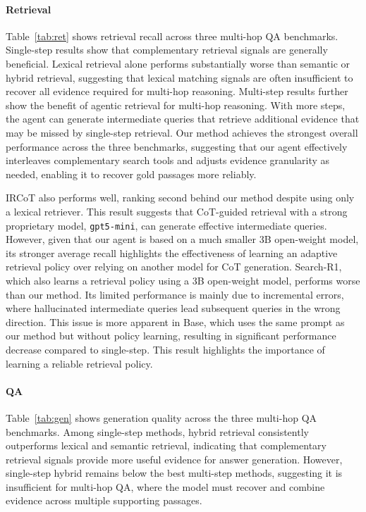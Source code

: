 \documentclass[11pt]{article}
\newcommand{\ml}[1]{\textcolor{orange}{\bf [lan: #1]}}
\begin{document}
\paragraph{Retrieval} 
Table~\ref{tab:ret} shows retrieval recall across three multi-hop QA benchmarks. Single-step results show that complementary retrieval signals are generally beneficial. Lexical retrieval alone performs substantially worse than semantic or hybrid retrieval, suggesting that lexical matching signals are often insufficient to recover all evidence required for multi-hop reasoning.
Multi-step results further show the benefit of agentic retrieval for multi-hop reasoning. With more steps, the agent can generate intermediate queries that retrieve additional evidence that may be missed by single-step retrieval. Our method achieves the strongest overall performance across the three benchmarks, suggesting that our agent effectively interleaves complementary search tools and adjusts evidence granularity as needed, enabling it to recover gold passages more reliably.

IRCoT also performs well, ranking second behind our method despite using only a lexical retriever. This result suggests that CoT-guided retrieval with a strong proprietary model, \texttt{gpt5-mini}, can generate effective intermediate queries. However, given that our agent is based on a much smaller 3B open-weight model, its stronger average recall highlights the effectiveness of learning an adaptive retrieval policy over relying on another model for CoT generation. 
%
Search-R1, which also learns a retrieval policy using a 3B open-weight model, performs worse than our method. Its limited performance is mainly due to incremental errors, where hallucinated intermediate queries lead subsequent queries in the wrong direction. This issue is more apparent in Base, which uses the same prompt as our method but without policy learning, resulting in significant performance decrease compared to single-step. This result highlights the importance of learning a reliable retrieval policy.


\paragraph{QA}



Table~\ref{tab:gen} shows generation quality across the three multi-hop QA benchmarks. Among single-step methods, hybrid retrieval consistently outperforms lexical and semantic retrieval, indicating that complementary retrieval signals provide more useful evidence for answer generation. However, single-step hybrid remains below the best multi-step methods, suggesting it is insufficient for multi-hop QA, where the model must recover and combine evidence across multiple supporting passages.
\end{document}
